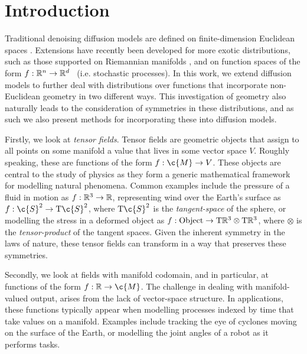 
\section{Introduction}
\label{sec:intro}

Traditional denoising diffusion models are defined on finite-dimension Euclidean spaces \parencite{song2019generative,song2020score,ho2020denoising,nichol2021beatgans}.
Extensions have recently been developed for more exotic distributions, such as those supported on Riemannian manifolds \parencite{de2022riemannian,huang2022riemannian,lou2023reflected,fishman2023diffusion}, and on function spaces of the form \(f:\mathbb{R}^n\to\mathbb{R}^d\)~\parencite{dutordoir2022Neural,kerrigan2022Diffusion,lim2023scorefunction,pidstrigach2023InfiniteDimensional,franzese2023continuous,bond2023infty} (i.e. stochastic processes).
In this work, we extend diffusion models to further deal with distributions over functions that incorporate non-Euclidean geometry in two different ways.
This investigation of geometry also naturally leads to the consideration of symmetries in these distributions, and as such we also present methods for incorporating these into diffusion models.

Firstly, we look at \textit{tensor fields}.
Tensor fields are geometric objects that assign to all points on some manifold a value that lives in some vector space \(V\).
Roughly speaking, these are functions of the form \(f: \c{M}\to V\).
These objects are central to the study of physics as they form a generic mathematical framework for modelling natural phenomena.
Common examples include the pressure of a fluid in motion as \(f: \mathbb{R}^3 \to \mathbb{R}\), representing wind over the Earth's surface as \(f: \c{S}^2 \to \mathrm{T}\c{S}^2\), where \(\mathrm{T}\c{S}^2\) is the \textit{tangent-space} of the sphere, or modelling the stress in a deformed object as \(f: \text{Object} \to \mathrm{T}\mathbb{R}^3 \otimes \mathrm{T}\mathbb{R}^3\), where \(\otimes\) is the \textit{tensor-product} of the tangent spaces.
Given the inherent symmetry in the laws of nature, these tensor fields can transform in a way that preserves these symmetries.

Secondly, we look at fields with manifold codomain, and in particular, at functions of the form \(f: \R \to \c{M}\).
The challenge in dealing with manifold-valued output, arises from the lack of vector-space structure.
In applications, these functions typically appear when modelling processes indexed by time that take values on a manifold.
Examples include tracking the eye of cyclones moving on the surface of the Earth, or modelling the joint angles of a robot as it performs tasks.

